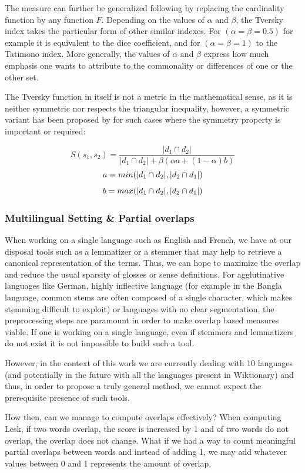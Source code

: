 \documentclass[10pt, a4paper]{article}
\begin{document}
The measure can further be generalized following \cite{DBLP:conf/otm/PirroE10} by replacing the cardinality function by any function \(F\). Depending on the values of \(\alpha\) and \(\beta\), the Tversky index takes the particular form of other similar indexes. For \((\alpha=\beta=0.5)\) for example it is equivalent to the dice coefficient, and for  \((\alpha=\beta=1)\) to the Tatimono index. More generally, the values of \(\alpha\) and \(\beta\) express how much emphasis one wants to attribute to the commonality or differences of one or the other set.

 The Tversky function in itself is not a metric in the mathematical sense, as it is neither symmetric nor respects the triangular inequality, however, a symmetric variant has been proposed by \cite{Jimenez2010} for such cases where the symmetry property is important or required: 
 
 \[
 S(s_1,s_2) = \frac{|d_1\cap d_2|}{|d_1\cap d_2| + \beta (\alpha a + (1-\alpha)b)}\]
 \[
 a=min(|d_1\cap d_2|,|d_2\cap d_1|)\\
 \]\[
 b=max(|d_1\cap d_2|,|d_2\cap d_1|)\\ 
 \]

\subsubsection{Multilingual Setting \& Partial overlaps}
 When working on a single language such as English and French, we have at our disposal tools such as a lemmatizer or a stemmer that may help to retrieve a canonical representation of the terms. Thus, we can hope to maximize the overlap and reduce the usual sparsity of glosses or sense definitions. For agglutinative languages like German, highly inflective language (for example in the Bangla language, common stems are often composed of a single character, which makes stemming difficult to exploit) or languages with no clear segmentation, the preprocessing steps are paramount in order to make overlap based measures viable. If one is working on a single language, even if stemmers and lemmatizers do not exist it is not impossible to build such a tool.

However, in the context of this work we are currently dealing with 10 languages (and potentially in the future with all the languages present in Wiktionary) and thus, in order to propose a truly general method, we cannot expect the prerequisite presence of such tools. 

How then, can we manage to compute overlaps effectively? When computing Lesk, if two words overlap, the score is increased by 1 and of two words do not overlap, the overlap does not change. What if we had a way to count meaningful partial overlaps between words and instead of adding 1, we may add whatever values between 0 and 1 represents the amount of overlap.
\end{document}
